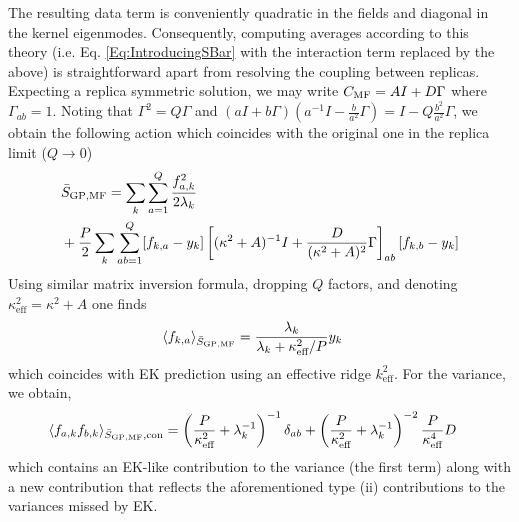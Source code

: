 The resulting data term is conveniently quadratic in the fields and diagonal in the kernel eigenmodes. Consequently, computing averages according to this theory (i.e. Eq. \ref{Eq:IntroducingSBar} with the interaction term replaced by the above) is straightforward apart from resolving the coupling between replicas. Expecting a replica symmetric solution, we may write $C_{\text{MF}}=A I+ D \Gamma$ where $\Gamma_{ab}=1$. Noting that $\Gamma^2=Q\Gamma$ and $(a I + b \Gamma)(a^{-1} I - \frac{b}{a^2} \Gamma)=I-Q\frac{b^2}{a^2} \Gamma$, we obtain the following action which coincides with the original one in the replica limit ($Q\rightarrow 0$) 
\begin{align}
&\bar{S}_{\text{GP},\text{MF}} = \sum_k \sum_{a=1}^Q \frac{f_{a,k}^2}{2\lambda_k} \\ \nonumber &+ \frac{P}{2} \sum_k \sum_{ab=1}^Q [f_{k,a}-y_k]\left[(\kappa^2+A)^{-1} I+\frac{D}{(\kappa^2+A)^2}\Gamma\right]_{ab}[f_{k,b}-y_k] 
\end{align}
Using similar matrix inversion formula, dropping $Q$ factors, and denoting $\kappa_{\text{eff}}^2=\kappa^2+A$ one finds 
\begin{align}\label{eq:barf}
\langle f_{k,a}\rangle_{\bar{S}_{\text{GP},\text{MF}}} &= \frac{\lambda_k}{\lambda_k+\kappa^2_{\text{eff}}/P} y_k
\end{align}
which coincides with EK prediction using an effective ridge $k^2_{\text{eff}}$. For the variance, we obtain, 
\begin{align}\label{eq:f_k_f_k_connected}
\langle f_{a,k} f_{b,k} \rangle_{\bar{S}_{\text{GP},\text{MF}},\text{con}} &= \left( \frac{P} {\kappa^{2}_{\text{eff}}} + \lambda_k^{-1} \right)^{-1} \delta_{ab} + \left( \frac{P} {\kappa^{2}_{\text{eff}}} + \lambda_k^{-1} \right)^{-2}\frac{P}{\kappa^{4}_{\text{eff}}} D 
\end{align}
which contains an EK-like contribution to the variance (the first term) along with a new contribution that reflects the aforementioned type (ii) contributions to the variances missed by EK. 

